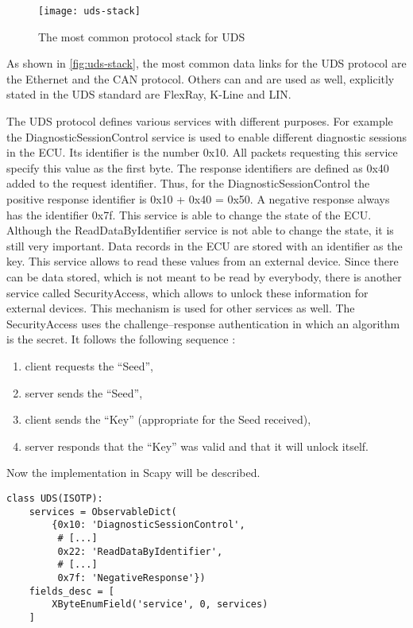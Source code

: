 \begin{figure}[h]
    \centering
    \texttt{[image: uds-stack]}
    \caption{The most common protocol stack for UDS \cite{Weiss2020}}
    \label{fig:uds-stack}
\end{figure}

As shown in \autoref{fig:uds-stack}, the most common data links for the UDS protocol are the Ethernet and the CAN protocol. Others can and are used as well, explicitly stated in the UDS standard are FlexRay, K-Line and LIN.

The UDS protocol defines various services with different purposes. For example the DiagnosticSessionControl service is used to enable different diagnostic sessions in the ECU. Its identifier is the number 0x10. All packets requesting this service specify this value as the first byte. The response identifiers are defined as 0x40 added to the request identifier. Thus, for the DiagnosticSessionControl the positive response identifier is 0x10 + 0x40 = 0x50. A negative response always has the identifier 0x7f. This service is able to change the state of the ECU. Although the ReadDataByIdentifier service is not able to change the state, it is still very important. Data records in the ECU are stored with an identifier as the key. This service allows to read these values from an external device. Since there can be data stored, which is not meant to be read by everybody, there is another service called SecurityAccess, which allows to unlock these information for external devices. This mechanism is used for other services as well. The SecurityAccess uses the challenge–response authentication in which an algorithm is the secret. It follows the following sequence \cite{iso14229}:

\begin{samepage}
\begin{enumerate}
  \item client requests the “Seed”,
  \item server sends the “Seed”,
  \item client sends the “Key” (appropriate for the Seed received),
  \item server responds that the “Key” was valid and that it will unlock itself.
\end{enumerate}
\end{samepage}

Now the implementation in Scapy will be described.

\begin{samepage}
\begin{verbatim}
class UDS(ISOTP):
    services = ObservableDict(
        {0x10: 'DiagnosticSessionControl',
         # [...]
         0x22: 'ReadDataByIdentifier',
         # [...]
         0x7f: 'NegativeResponse'})
    fields_desc = [
        XByteEnumField('service', 0, services)
    ]
\end{verbatim}
\end{samepage}

